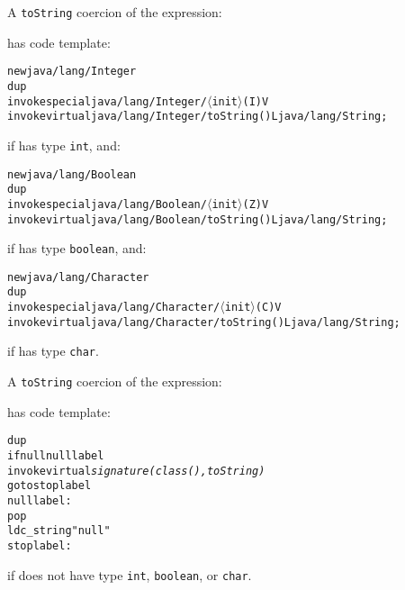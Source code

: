 \begin{slide*}
A {\tt toString} coercion of the expression:

\begin{scriptsize}
\begin{alltt}
\end{alltt}
\end{scriptsize}

has code template:

\newcommand{\II}{$\mathrm{\langle}$init$\mathrm{\rangle}$}
\begin{scriptsize}
\begin{alltt}
    new {\tiny\rm java/lang/Integer}
    dup
    invokespecial {\tiny\rm java/lang/Integer/\II{}(I)V}
    invokevirtual {\tiny\rm java/lang/Integer/toString()Ljava/lang/String;}
\end{alltt}
\end{scriptsize}

if  has type {\tt int}, and:

\begin{scriptsize}
\begin{alltt}
    new {\tiny\rm java/lang/Boolean}
    dup
    invokespecial {\tiny\rm java/lang/Boolean/\II{}(Z)V}
    invokevirtual {\tiny\rm java/lang/Boolean/toString()Ljava/lang/String;}
\end{alltt}
\end{scriptsize}
 
if  has type {\tt boolean}, and:

\begin{scriptsize}
\begin{alltt}
    new {\tiny\rm java/lang/Character}
    dup
    invokespecial {\tiny\rm java/lang/Character/\II{}(C)V}
    invokevirtual {\tiny\rm java/lang/Character/toString()Ljava/lang/String;}
\end{alltt}
\end{scriptsize}

if  has type {\tt char}.

\vfil
\end{slide*}
 
\begin{slide*}
A {\tt toString} coercion of the expression:
 
\begin{scriptsize}
\begin{alltt}
\end{alltt}
\end{scriptsize}
 
has code template:

\begin{scriptsize}
\begin{alltt}
    dup
    ifnull nulllabel
    invokevirtual {\em signature(class(),{\rm toString})}
    goto stoplabel
    nulllabel:
    pop
    ldc_string "null"
    stoplabel:
\end{alltt}
\end{scriptsize}

if  does not have type {\tt int}, {\tt boolean}, or {\tt char}.
\vfil
\end{slide*}

